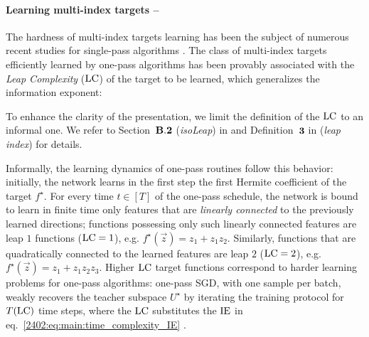 \paragraph{Learning multi-index targets -- } The hardness of 
multi-index targets learning has been the subject of numerous recent studies for single-pass algorithms \citep{abbe2021staircase,abbe2022merged,abbe2023sgd,bietti2023learning,zweig2023symmetric,dandi2023how}. The class of multi-index targets efficiently learned by one-pass algorithms has been provably associated with the \textit{Leap Complexity} ($\rm LC$) of the target to be learned, which generalizes the information exponent: 
\begin{remark}
    To enhance the clarity of the presentation, we limit the definition of the $\rm LC$ to an informal one. We refer to Section~$\bf B.2$ (\textit{isoLeap}) in \citep{abbe2023sgd} and Definition~$\bf 3$ in \citep{dandi2023how} (\textit{leap index}) for details.  
\end{remark}
Informally, the learning dynamics of one-pass routines follow this behavior: initially, the network learns in the first step the first Hermite coefficient of the target $f^\star$. For every time $t \in  [T]$ of the one-pass schedule, the network is bound to learn in finite time only features that are \textit{linearly connected} to the previously learned directions; functions possessing only such linearly connected features are leap $1$ functions ($\rm LC =1$), e.g. $f^\star(\vec z)  =  z_1  +  z_1z_2$. Similarly, functions that are quadratically connected to the learned features are leap $2$  ($\rm LC  =  2$), e.g. $f^\star (\vec z)  =  z_1 + z_1z_2z_3$.
 Higher $\rm{LC}$ target functions correspond to harder learning problems for one-pass algorithms:  one-pass SGD, with one sample per batch, weakly recovers the teacher subspace $U^\star$ by iterating the training protocol for $T(\rm{LC})$ time steps, where the $\rm{LC}$ substitutes the $\rm{IE}$ in eq.~\eqref{2402:eq:main:time_complexity_IE} \citep{abbe2023sgd}.

